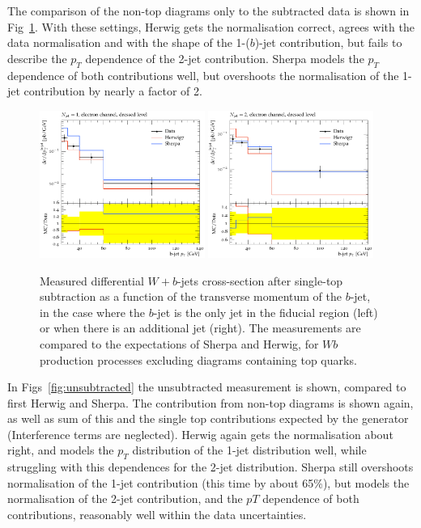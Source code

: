 \documentclass[11pt]{cernrep}
\begin{document}
The comparison of the non-top diagrams only to the subtracted data is shown in Fig~\ref{fig:subtracted}. 
With these settings, Herwig gets the normalisation correct, agrees with the data normalisation and with
the shape of the 1-($b$)-jet contribution, but fails to describe the $p_T$ dependence of the 2-jet contribution.
Sherpa models the $p_T$ dependence of both contributions well, but overshoots the normalisation of the 1-jet
contribution by nearly a factor of 2.

\begin{figure}
\centering
	\includegraphics[width=0.48\textwidth]{subtracted_h7_s22-1jet.pdf}
	\includegraphics[width=0.48\textwidth]{subtracted_h7_s22-2jet.pdf}
\caption{\label{fig:subtracted}
  Measured differential $W+b$-jets cross-section after single-top subtraction as a function of the
  transverse momentum of the $b$-jet, in the case where the $b$-jet is the only jet in the fiducial region
  (left) or when there is an additional jet (right). The measurements are compared to the expectations of
  Sherpa and Herwig, for $Wb$ production processes excluding diagrams containing top quarks.}
\end{figure}

In Figs~\ref{fig:unsubtracted} the unsubtracted measurement is shown, compared to first Herwig and Sherpa.
The contribution from non-top diagrams is shown again, as well as sum of this and the single top
contributions expected by the generator (Interference terms are neglected). Herwig again gets the
normalisation about right, and models the $p_T$ distribution of the 1-jet distribution well, while
struggling with this dependences for the 2-jet distribution. Sherpa still overshoots normalisation of
the 1-jet contribution (this time by about 65\%), but models the normalisation of the 2-jet contribution,
and the $pT$ dependence of both contributions, reasonably well within the data uncertainties.
\end{document}
